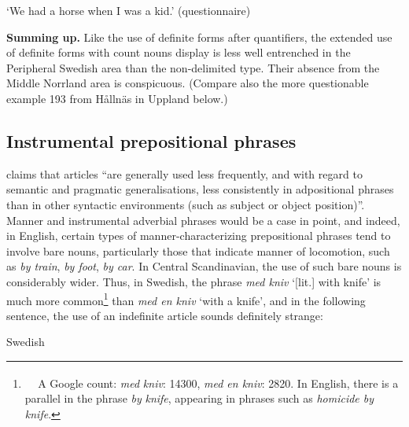 \begin{styleTranslation}
‘We had a horse when I was a kid.’ (questionnaire)

\end{styleTranslation}

\begin{styleBodytextC}
\textbf{Summing up.} Like the use of definite forms after quantifiers, the extended use of definite forms with count nouns display is less well entrenched in the Peripheral Swedish area than the non-delimited type. Their absence from the Middle Norrland area is conspicuous. (Compare also the more questionable example 193 from Hållnäs in Uppland below.)

\end{styleBodytextC}

\subsection{\rmfamily Instrumental prepositional phrases }

\begin{styleBodyTextFirst}
\citet{Himmelmann1998} claims that articles “are generally used less frequently, and with regard to semantic and pragmatic generalisations, less consistently in adpositional phrases than in other syntactic environments (such as subject or object position)”. Manner and instrumental adverbial phrases would be a case in point, and indeed, in English, certain types of manner-characterizing prepositional phrases tend to involve bare nouns, particularly those that indicate manner of locomotion, such as \textit{by train}, \textit{by foot}, \textit{by car}. In Central Scandinavian, the use of such bare nouns is considerably wider. Thus, in Swedish, the phrase \textit{med kniv} ‘[lit.] with knife’ is much more common\footnote{\textsuperscript{\ \ } A Google count: \textit{med }\textit{kniv}: 14300, \textit{med en kniv}: 2820. In English, there is a parallel in the phrase \textit{by} \textit{knife}, appearing in phrases such as \textit{homicide by knife}.} than \textit{med en kniv }‘with a knife’, and in the following sentence, the use of an indefinite article sounds definitely strange:

\end{styleBodyTextFirst}

\begin{listWWNumileveli}
\item 

\begin{styleExample}
\label{bkm:Ref224115033}Swedish

\end{styleExample}

\end{listWWNumileveli}

